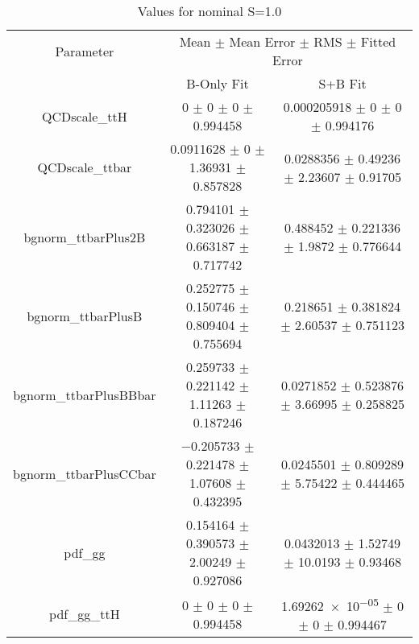 \begin{table}
\centering
\caption{Values for nominal S=1.0}
\begin{tabular}{ccc}
\toprule
Parameter & \multicolumn{2}{c}{Mean $\pm$ Mean Error $\pm$ RMS $\pm$ Fitted Error}\\
 & B-Only Fit & S+B Fit\\
\midrule
QCDscale\_ttH & \num{0} $\pm$ \num{0} $\pm$ \num{0} $\pm$ \num{0.994458} & \num{0.000205918} $\pm$ \num{0} $\pm$ \num{0} $\pm$ \num{0.994176}\\
QCDscale\_ttbar & \num{0.0911628} $\pm$ \num{0} $\pm$ \num{1.36931} $\pm$ \num{0.857828} & \num{0.0288356} $\pm$ \num{0.49236} $\pm$ \num{2.23607} $\pm$ \num{0.91705}\\
bgnorm\_ttbarPlus2B & \num{0.794101} $\pm$ \num{0.323026} $\pm$ \num{0.663187} $\pm$ \num{0.717742} & \num{0.488452} $\pm$ \num{0.221336} $\pm$ \num{1.9872} $\pm$ \num{0.776644}\\
bgnorm\_ttbarPlusB & \num{0.252775} $\pm$ \num{0.150746} $\pm$ \num{0.809404} $\pm$ \num{0.755694} & \num{0.218651} $\pm$ \num{0.381824} $\pm$ \num{2.60537} $\pm$ \num{0.751123}\\
bgnorm\_ttbarPlusBBbar & \num{0.259733} $\pm$ \num{0.221142} $\pm$ \num{1.11263} $\pm$ \num{0.187246} & \num{0.0271852} $\pm$ \num{0.523876} $\pm$ \num{3.66995} $\pm$ \num{0.258825}\\
bgnorm\_ttbarPlusCCbar & \num{-0.205733} $\pm$ \num{0.221478} $\pm$ \num{1.07608} $\pm$ \num{0.432395} & \num{0.0245501} $\pm$ \num{0.809289} $\pm$ \num{5.75422} $\pm$ \num{0.444465}\\
pdf\_gg & \num{0.154164} $\pm$ \num{0.390573} $\pm$ \num{2.00249} $\pm$ \num{0.927086} & \num{0.0432013} $\pm$ \num{1.52749} $\pm$ \num{10.0193} $\pm$ \num{0.93468}\\
pdf\_gg\_ttH & \num{0} $\pm$ \num{0} $\pm$ \num{0} $\pm$ \num{0.994458} & \num{1.69262e-05} $\pm$ \num{0} $\pm$ \num{0} $\pm$ \num{0.994467}\\
\bottomrule
\end{tabular}
\end{table}
